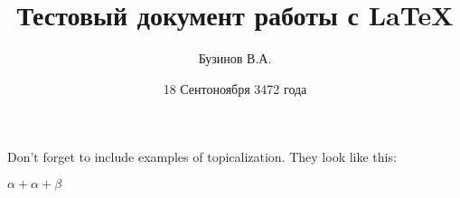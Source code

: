 \documentclass[a4paper, 12pt]{article} %
\author{Бузинов В.А.}
\title{Тестовый документ работы с LaTeX}
\date{18 Сентоноября 3472 года}
\begin{document}
\maketitle

Don't forget to include examples of topicalization.
They look like this:

$\alpha + \alpha + \beta$
\end{document}
